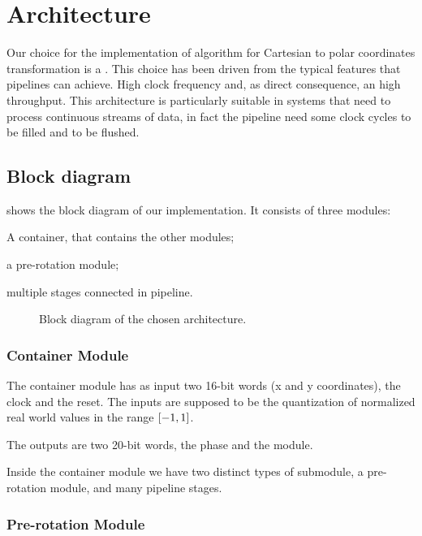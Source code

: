 \section{Architecture}\label{sec:arch}

Our choice for the implementation of \cordic{} algorithm for Cartesian to polar
coordinates transformation is a . This choice
has been driven from the typical features that pipelines can achieve. High clock
frequency and, as direct consequence, an high throughput. This architecture is
particularly suitable in systems that need to process continuous streams of
data, in fact the pipeline need some clock cycles to be filled and to be
flushed.

\subsection{Block diagram}

 shows the block diagram of our implementation. It
consists of three modules:
\begin{enumerate*}[label=]
	\item A container, that contains the other modules;
	\item a pre-rotation module;
	\item multiple stages connected in pipeline.
\end{enumerate*}

\begin{figure}[hb]
	\caption{Block diagram of the chosen architecture.}\label{fig:blockdiagram}
\end{figure}

\subsubsection{Container Module}

The container module has as input two 16-bit words (x and y coordinates), the
clock and the reset. The inputs are supposed to be the quantization of
normalized real world values in the range \(\interval{-1}{1}\).

The outputs are two 20-bit words, the phase and the module.

Inside the container module we have two distinct types of submodule, a
pre-rotation module, and many pipeline stages.

\subsubsection{Pre-rotation Module}

